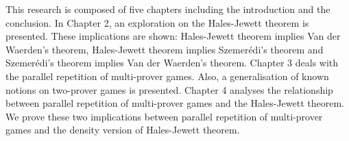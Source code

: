 This research is composed of five chapters including the introduction and the conclusion. In Chapter 2, an exploration on the Hales-Jewett theorem is presented. These implications are shown:  Hales-Jewett theorem implies Van der Waerden's theorem, Hales-Jewett theorem implies Szemerédi's theorem and Szemerédi's theorem implies Van der Waerden's theorem. Chapter 3 deals with the parallel repetition of  multi-prover games. Also, a generalisation of  known notions on two-prover games is presented. Chapter 4 analyses the relationship between parallel repetition of multi-prover games and the Hales-Jewett theorem.  We prove these two implications between  parallel repetition of multi-prover games and the density version of Hales-Jewett theorem. 



%
%





